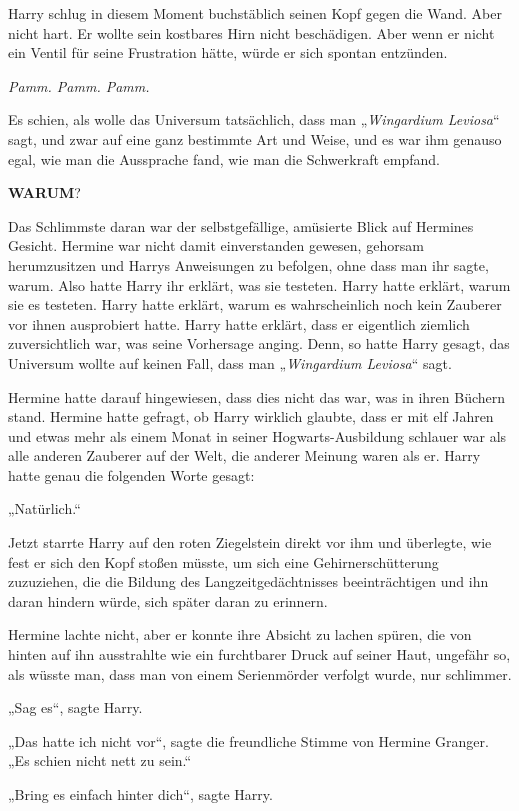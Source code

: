 {Harry schlug in diesem Moment buchstäblich seinen Kopf gegen die Wand. Aber nicht hart. Er wollte sein kostbares Hirn nicht beschädigen. Aber wenn er nicht ein Ventil für seine Frustration hätte, würde er sich spontan entzünden.

\emph{Pamm. Pamm. Pamm.}

Es schien, als wolle das Universum tatsächlich, dass man „\emph{Wingardium Leviosa}“ sagt, und zwar auf eine ganz bestimmte Art und Weise, und es war ihm genauso egal, wie man die Aussprache fand, wie man die Schwerkraft empfand.

\textbf{WARUM}?

Das Schlimmste daran war der selbstgefällige, amüsierte Blick auf Hermines Gesicht. Hermine war nicht damit einverstanden gewesen, gehorsam herumzusitzen und Harrys Anweisungen zu befolgen, ohne dass man ihr sagte, warum. Also hatte Harry ihr erklärt, was sie testeten. Harry hatte erklärt, warum sie es testeten. Harry hatte erklärt, warum es wahrscheinlich noch kein Zauberer vor ihnen ausprobiert hatte. Harry hatte erklärt, dass er eigentlich ziemlich zuversichtlich war, was seine Vorhersage anging. Denn, so hatte Harry gesagt, das Universum wollte auf keinen Fall, dass man „\emph{Wingardium Leviosa}“ sagt.

Hermine hatte darauf hingewiesen, dass dies nicht das war, was in ihren Büchern stand. Hermine hatte gefragt, ob Harry wirklich glaubte, dass er mit elf Jahren und etwas mehr als einem Monat in seiner Hogwarts-Ausbildung schlauer war als alle anderen Zauberer auf der Welt, die anderer Meinung waren als er. Harry hatte genau die folgenden Worte gesagt:

„Natürlich.“

Jetzt starrte Harry auf den roten Ziegelstein direkt vor ihm und überlegte, wie fest er sich den Kopf stoßen müsste, um sich eine Gehirnerschütterung zuzuziehen, die die Bildung des Langzeitgedächtnisses beeinträchtigen und ihn daran hindern würde, sich später daran zu erinnern.

Hermine lachte nicht, aber er konnte ihre Absicht zu lachen spüren, die von hinten auf ihn ausstrahlte wie ein furchtbarer Druck auf seiner Haut, ungefähr so, als wüsste man, dass man von einem Serienmörder verfolgt wurde, nur schlimmer.

„Sag es“, sagte Harry.

„Das hatte ich nicht vor“, sagte die freundliche Stimme von Hermine Granger. „Es schien nicht nett zu sein.“

„Bring es einfach hinter dich“, sagte Harry.

}
